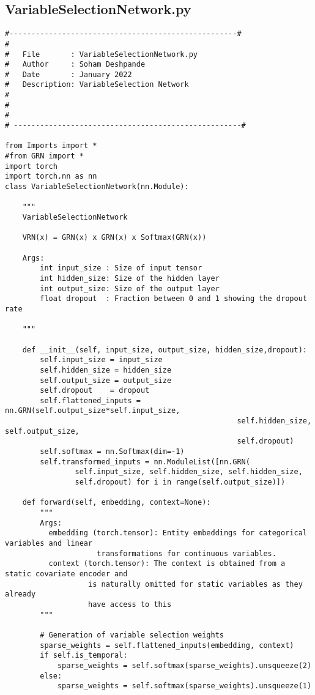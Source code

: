 \documentclass{article}
\begin{document}
\subsection{VariableSelectionNetwork.py}
\begin{lstlisting}
#----------------------------------------------------#
#
#   File       : VariableSelectionNetwork.py
#   Author     : Soham Deshpande
#   Date       : January 2022
#   Description: VariableSelection Network
#
#
#
# ----------------------------------------------------#

from Imports import *
#from GRN import *
import torch
import torch.nn as nn
class VariableSelectionNetwork(nn.Module):

    """
    VariableSelectionNetwork

    VRN(x) = GRN(x) x GRN(x) x Softmax(GRN(x))

    Args:
        int input_size : Size of input tensor
        int hidden_size: Size of the hidden layer
        int output_size: Size of the output layer
        float dropout  : Fraction between 0 and 1 showing the dropout rate

    """

    def __init__(self, input_size, output_size, hidden_size,dropout):
        self.input_size = input_size
        self.hidden_size = hidden_size
        self.output_size = output_size
        self.dropout    = dropout
        self.flattened_inputs = nn.GRN(self.output_size*self.input_size,
                                                     self.hidden_size, self.output_size,
                                                     self.dropout)
        self.softmax = nn.Softmax(dim=-1)
        self.transformed_inputs = nn.ModuleList([nn.GRN(
                self.input_size, self.hidden_size, self.hidden_size,
                self.dropout) for i in range(self.output_size)])

    def forward(self, embedding, context=None):
        """
        Args:
          embedding (torch.tensor): Entity embeddings for categorical variables and linear
                     transformations for continuous variables.
          context (torch.tensor): The context is obtained from a static covariate encoder and
                   is naturally omitted for static variables as they already
                   have access to this
        """

        # Generation of variable selection weights
        sparse_weights = self.flattened_inputs(embedding, context)
        if self.is_temporal:
            sparse_weights = self.softmax(sparse_weights).unsqueeze(2)
        else:
            sparse_weights = self.softmax(sparse_weights).unsqueeze(1)


\end{lstlisting}
\end{document}
